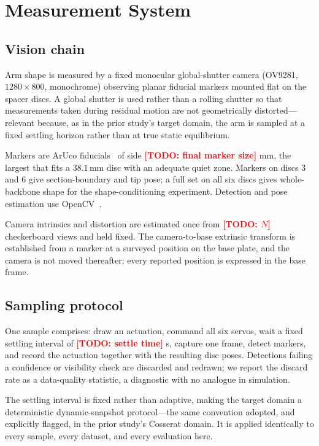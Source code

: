 \documentclass[letterpaper, 10pt, conference]{ieeeconf}
\newcommand{\todo}[1]{\textcolor{red}{\textbf{[TODO: #1]}}}
\begin{document}
\section{Measurement System}
\label{sec:sensing}

\subsection{Vision chain}

Arm shape is measured by a fixed monocular global-shutter camera
(OV9281, $1280\times800$, monochrome) observing planar fiducial markers
mounted flat on the spacer discs. A global shutter is used rather than a
rolling shutter so that measurements taken during residual motion are not
geometrically distorted---relevant because, as in the prior study's target
domain, the arm is sampled at a fixed settling horizon rather than at true
static equilibrium.

Markers are ArUco fiducials~\cite{garrido2014automatic} of side
\todo{final marker size} mm, the largest that fits a $38.1\,$mm disc with an
adequate quiet zone. Markers on discs 3 and 6 give section-boundary and tip
pose; a full set on all six discs gives whole-backbone shape for the
shape-conditioning experiment. Detection and pose estimation use
OpenCV~\cite{bradski2000opencv}.

Camera intrinsics and distortion are estimated once from
\todo{$N$} checkerboard views and held fixed. The camera-to-base extrinsic
transform is established from a marker at a surveyed position on the base
plate, and the camera is not moved thereafter; every reported position is
expressed in the base frame.

\subsection{Sampling protocol}

One sample comprises: draw an actuation, command all six servos, wait a fixed
settling interval of \todo{settle time} s, capture one frame, detect markers,
and record the actuation together with the resulting disc poses. Detections
failing a confidence or visibility check are discarded and redrawn; we report
the discard rate as a data-quality statistic, a diagnostic with no analogue in
simulation.

The settling interval is fixed rather than adaptive, making the target domain
a deterministic dynamic-snapshot protocol---the same convention adopted, and
explicitly flagged, in the prior study's Cosserat domain. It is applied
identically to every sample, every dataset, and every evaluation here.
\end{document}
